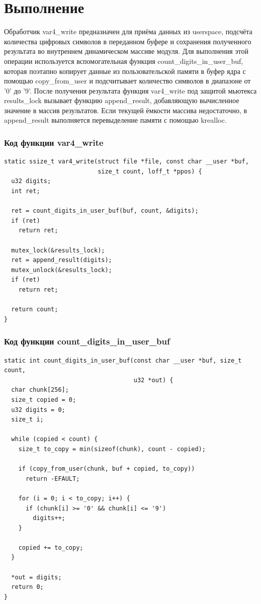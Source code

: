 \documentclass[12pt,a4paper]{report}
\begin{document}
\section*{Выполнение}
Обработчик var4\_write предназначен для приёма данных из userspace, подсчёта количества цифровых символов в переданном буфере и
сохранения полученного результата во внутреннем динамическом массиве модуля. Для выполнения этой операции используется вспомогательная функция count\_digits\_in\_user\_buf, которая поэтапно копирует данные из пользовательской памяти в буфер ядра с помощью copy\_from\_user и подсчитывает количество символов в диапазоне от '0' до '9'. После получения результата функция var4\_write под защитой мьютекса results\_lock вызывает функцию append\_result, добавляющую вычисленное значение в массив результатов. Если текущей ёмкости массива недостаточно, в append\_result выполняется перевыделение памяти с помощью krealloc.

\subsubsection*{Код функции var4\_write}
\begin{verbatim}
static ssize_t var4_write(struct file *file, const char __user *buf,
                          size_t count, loff_t *ppos) {
  u32 digits;
  int ret;

  ret = count_digits_in_user_buf(buf, count, &digits);
  if (ret)
    return ret;

  mutex_lock(&results_lock);
  ret = append_result(digits);
  mutex_unlock(&results_lock);
  if (ret)
    return ret;

  return count;
}
\end{verbatim}

\subsubsection*{Код функции count\_digits\_in\_user\_buf}
\begin{verbatim}
static int count_digits_in_user_buf(const char __user *buf, size_t count,
                                    u32 *out) {
  char chunk[256];
  size_t copied = 0;
  u32 digits = 0;
  size_t i;

  while (copied < count) {
    size_t to_copy = min(sizeof(chunk), count - copied);

    if (copy_from_user(chunk, buf + copied, to_copy))
      return -EFAULT;

    for (i = 0; i < to_copy; i++) {
      if (chunk[i] >= '0' && chunk[i] <= '9')
        digits++;
    }

    copied += to_copy;
  }

  *out = digits;
  return 0;
}
\end{verbatim}
\end{document}
